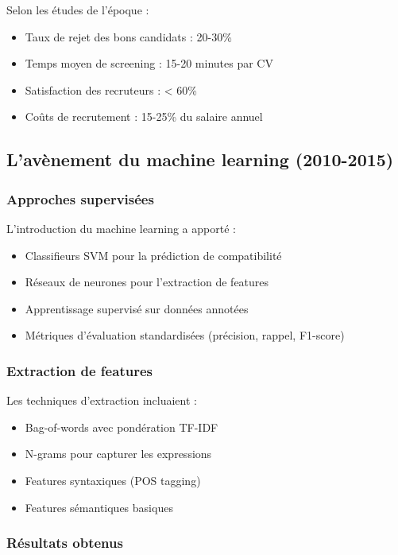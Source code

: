 \documentclass[12pt,a4paper]{report}
\begin{document}
Selon les études de l'époque :
\begin{itemize}
\item Taux de rejet des bons candidats : 20-30\%
\item Temps moyen de screening : 15-20 minutes par CV
\item Satisfaction des recruteurs : < 60\%
\item Coûts de recrutement : 15-25\% du salaire annuel
\end{itemize}

\subsection{L'avènement du machine learning (2010-2015)}

\subsubsection{Approches supervisées}

L'introduction du machine learning a apporté :
\begin{itemize}
\item Classifieurs SVM pour la prédiction de compatibilité
\item Réseaux de neurones pour l'extraction de features
\item Apprentissage supervisé sur données annotées
\item Métriques d'évaluation standardisées (précision, rappel, F1-score)
\end{itemize}

\subsubsection{Extraction de features}

Les techniques d'extraction incluaient :
\begin{itemize}
\item Bag-of-words avec pondération TF-IDF
\item N-grams pour capturer les expressions
\item Features syntaxiques (POS tagging)
\item Features sémantiques basiques
\end{itemize}

\subsubsection{Résultats obtenus}
\end{document}
